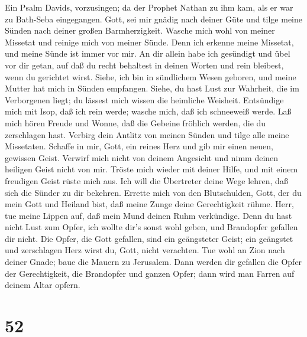  Ein Psalm Davids, vorzusingen; da der Prophet Nathan zu ihm
kam, als er war zu Bath-Seba eingegangen. Gott, sei mir gnädig nach
deiner Güte und tilge meine Sünden nach deiner großen Barmherzigkeit.
 Wasche mich wohl von meiner Missetat und reinige mich von
meiner Sünde.  Denn ich erkenne meine Missetat, und meine
Sünde ist immer vor mir.  An dir allein habe ich gesündigt
und übel vor dir getan, auf daß du recht behaltest in deinen Worten und
rein bleibest, wenn du gerichtet wirst.  Siehe, ich bin in
sündlichem Wesen geboren, und meine Mutter hat mich in Sünden empfangen.
 Siehe, du hast Lust zur Wahrheit, die im Verborgenen liegt;
du lässest mich wissen die heimliche Weisheit.  Entsündige
mich mit Isop, daß ich rein werde; wasche mich, daß ich schneeweiß
werde.  Laß mich hören Freude und Wonne, daß die Gebeine
fröhlich werden, die du zerschlagen hast.  Verbirg dein
Antlitz von meinen Sünden und tilge alle meine Missetaten. 
Schaffe in mir, Gott, ein reines Herz und gib mir einen neuen, gewissen
Geist.  Verwirf mich nicht von deinem Angesicht und nimm
deinen heiligen Geist nicht von mir.  Tröste mich wieder
mit deiner Hilfe, und mit einem freudigen Geist rüste mich aus.
 Ich will die Übertreter deine Wege lehren, daß sich die
Sünder zu dir bekehren.  Errette mich von den Blutschulden,
Gott, der du mein Gott und Heiland bist, daß meine Zunge deine
Gerechtigkeit rühme.  Herr, tue meine Lippen auf, daß mein
Mund deinen Ruhm verkündige.  Denn du hast nicht Lust zum
Opfer, ich wollte dir's sonst wohl geben, und Brandopfer gefallen dir
nicht.  Die Opfer, die Gott gefallen, sind ein geängsteter
Geist; ein geängstet und zerschlagen Herz wirst du, Gott, nicht
verachten.  Tue wohl an Zion nach deiner Gnade; baue die
Mauern zu Jerusalem.  Dann werden dir gefallen die Opfer
der Gerechtigkeit, die Brandopfer und ganzen Opfer; dann wird man Farren
auf deinem Altar opfern.

\hypertarget{section-51}{%
\section{52}\label{section-51}}


